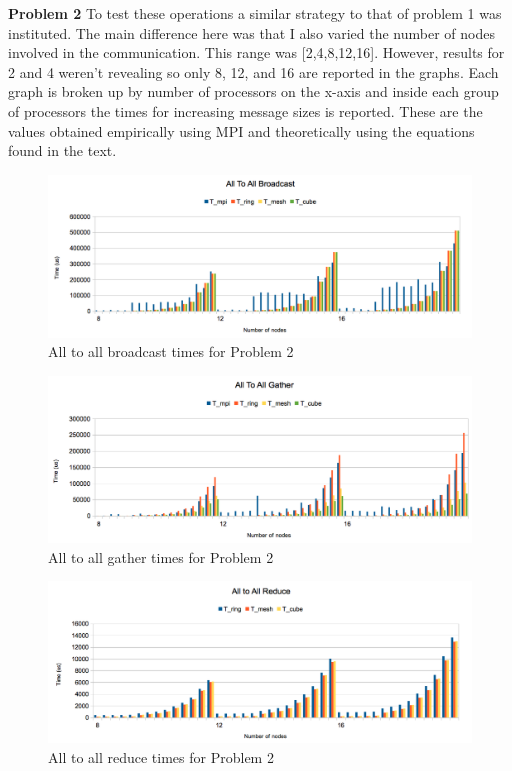 \documentclass[11pt]{article}
\begin{document}
 {\bf Problem 2} To test these operations a similar strategy to that
 of problem 1 was instituted. The main difference here was that I also
 varied the number of nodes involved in the communication. This range
 was [2,4,8,12,16]. However, results for 2 and 4 weren't revealing so
 only 8, 12, and 16 are reported in the graphs. Each graph is broken
 up by number of processors on the x-axis and inside each group of
 processors the times for increasing message sizes is reported. These
 are the values obtained empirically using MPI and theoretically using
 the equations found in the text.\\
 \begin{figure}[h]
   \includegraphics[width=\textwidth]{images/all2all.png}
   \caption{All to all broadcast times for Problem 2}
 \end{figure}
 \begin{figure}[h!]
   \includegraphics[width=\textwidth]{images/allgather.png}
   \caption{All to all gather times for Problem 2}
 \end{figure}
 \begin{figure}[ht]
   \includegraphics[width=\textwidth]{images/allreduce.png}
   \caption{All to all reduce times for Problem 2}
 \end{figure}
\end{document}
